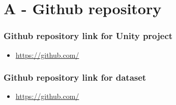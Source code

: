 

\chapter*{A - Github repository}


\subsection*{Github repository link for Unity project}
\begin{itemize}
    \item \url{https://github.com/}
\end{itemize}

\subsection*{Github repository link for dataset}
\begin{itemize}
    \item \url{https://github.com/}
\end{itemize}







